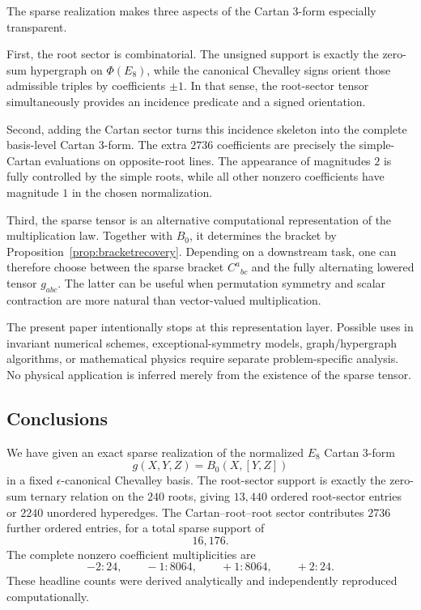 \documentclass[11pt]{article}
\theoremstyle{definition}
\theoremstyle{remark}
\newcommand{\PhiE}{\Phi(E_8)}
\begin{document}
The sparse realization makes three aspects of the Cartan 3-form especially transparent.

First, the root sector is combinatorial.  The unsigned support is exactly the zero-sum hypergraph on $\PhiE$, while the canonical Chevalley signs orient those admissible triples by coefficients $\pm1$.  In that sense, the root-sector tensor simultaneously provides an incidence predicate and a signed orientation.

Second, adding the Cartan sector turns this incidence skeleton into the complete basis-level Cartan 3-form.  The extra $2736$ coefficients are precisely the simple-Cartan evaluations on opposite-root lines.  The appearance of magnitudes $2$ is fully controlled by the simple roots, while all other nonzero coefficients have magnitude $1$ in the chosen normalization.

Third, the sparse tensor is an alternative computational representation of the multiplication law.  Together with $B_0$, it determines the bracket by Proposition~\ref{prop:bracketrecovery}.  Depending on a downstream task, one can therefore choose between the sparse bracket $C^a{}_{bc}$ and the fully alternating lowered tensor $g_{abc}$.  The latter can be useful when permutation symmetry and scalar contraction are more natural than vector-valued multiplication.

The present paper intentionally stops at this representation layer.  Possible uses in invariant numerical schemes, exceptional-symmetry models, graph/hypergraph algorithms, or mathematical physics require separate problem-specific analysis.  No physical application is inferred merely from the existence of the sparse tensor.

\subsection{Conclusions}\label{sec:conclusion}

We have given an exact sparse realization of the normalized $E_8$ Cartan 3-form
\[
g(X,Y,Z)=B_0(X,[Y,Z])
\]
in a fixed $\epsilon$-canonical Chevalley basis.  The root-sector support is exactly the zero-sum ternary relation on the $240$ roots, giving $13{,}440$ ordered root-sector entries or $2240$ unordered hyperedges.  The Cartan--root--root sector contributes $2736$ further ordered entries, for a total sparse support of
\[
16{,}176.
\]
The complete nonzero coefficient multiplicities are
\[
-2:24,\qquad -1:8064,\qquad +1:8064,\qquad +2:24.
\]
These headline counts were derived analytically and independently reproduced computationally.
\end{document}
